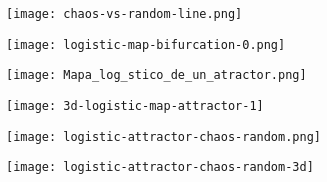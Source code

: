 \documentclass{article}
\begin{document}
\begin{figure}[h]
\centering
\texttt{[image: chaos-vs-random-line.png]}
\end{figure}

\begin{figure}[h]
\centering
\texttt{[image: logistic-map-bifurcation-0.png]}
\end{figure}

\begin{figure}[h]
\centering
\texttt{[image: Mapa\_log\_stico\_de\_un\_atractor.png]}
\end{figure}

\begin{figure}[h]
\centering
\texttt{[image: 3d-logistic-map-attractor-1]}
\end{figure}

\begin{figure}[h]
\centering
\texttt{[image: logistic-attractor-chaos-random.png]}
\end{figure}

\begin{figure}[h]
\centering
\texttt{[image: logistic-attractor-chaos-random-3d]}
\end{figure}
\end{document}
